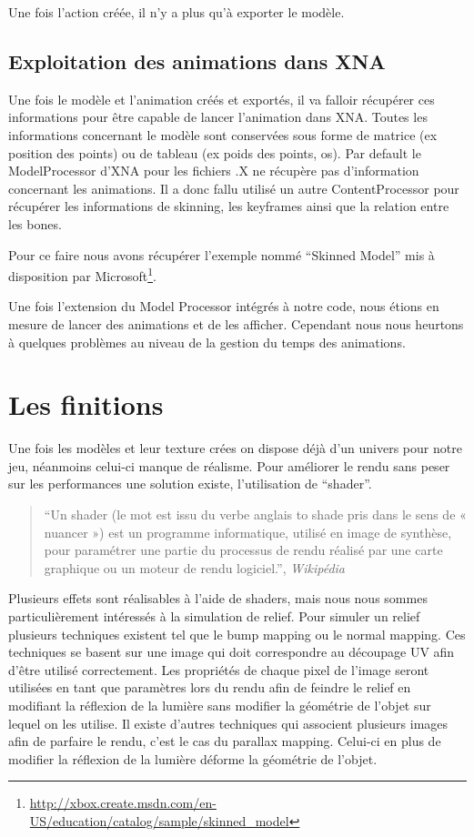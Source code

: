 \documentclass[11pt]{report}
\begin{document}
Une fois l’action créée, il n’y a plus qu’à exporter le modèle.

\subsection{Exploitation des animations dans XNA}

Une fois le modèle et l’animation créés et exportés, il va falloir récupérer ces informations pour être capable de lancer l’animation dans XNA. Toutes les informations concernant le modèle sont conservées sous forme de matrice (ex position des points) ou de tableau (ex poids des points, os). 
Par default le ModelProcessor d’XNA pour les fichiers .X ne récupère pas d’information concernant les animations. Il a donc fallu utilisé un autre ContentProcessor pour récupérer les informations de skinning, les  keyframes ainsi que la relation entre les bones.

Pour ce faire nous avons récupérer l'exemple nommé ``Skinned Model'' mis à disposition par Microsoft\footnote{\url{http://xbox.create.msdn.com/en-US/education/catalog/sample/skinned_model}}.

Une fois l’extension du Model Processor intégrés à notre code, nous étions en mesure de lancer des animations et de les afficher. Cependant nous nous heurtons à quelques problèmes au niveau de la gestion du temps des animations.

\section{Les finitions}

Une fois les modèles et leur texture crées on dispose déjà d’un univers pour notre jeu, néanmoins celui-ci manque de réalisme. Pour améliorer le rendu sans peser sur les performances une solution existe, l’utilisation de ``shader''.

\begin{quote}
``Un shader (le mot est issu du verbe anglais to shade pris dans le sens de « nuancer ») est un programme informatique, utilisé en image de synthèse, pour paramétrer une partie du processus de rendu réalisé par une carte graphique ou un moteur de rendu logiciel.'', \emph{Wikipédia}
\end{quote}

Plusieurs effets sont réalisables à l’aide de shaders, mais nous nous sommes particulièrement intéressés à la simulation de relief. Pour simuler un relief plusieurs techniques existent tel que le bump mapping ou le normal mapping. Ces techniques se basent sur une image qui doit correspondre au découpage UV afin d’être utilisé correctement. Les propriétés de chaque pixel de l’image seront utilisées en tant que paramètres lors du rendu afin de feindre le relief en modifiant la réflexion de la lumière sans modifier la géométrie de l’objet sur lequel on les utilise. Il existe d’autres techniques qui associent plusieurs images afin de parfaire le rendu, c’est le cas du parallax mapping. Celui-ci en plus de modifier la réflexion de la lumière déforme la géométrie de l’objet.
\end{document}
